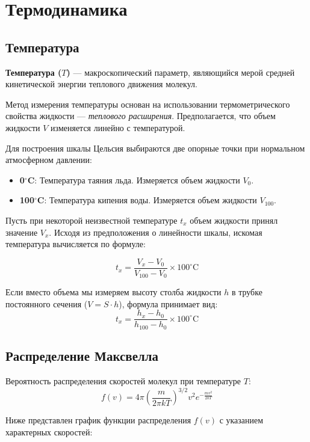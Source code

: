 \section{Термодинамика}

\subsection{Температура}

\textbf{Температура ($T$)} --- макроскопический параметр, являющийся мерой средней кинетической энергии теплового движения молекул.

Метод измерения температуры основан на использовании термометрического свойства жидкости --- \textit{теплового расширения}. Предполагается, что объем жидкости $V$ изменяется линейно с температурой.

Для построения шкалы Цельсия выбираются две опорные точки при нормальном атмосферном давлении:
\begin{itemize}
    \item \textbf{0$^\circ$C}: Температура таяния льда. Измеряется объем жидкости $V_0$.
    \item \textbf{100$^\circ$C}: Температура кипения воды. Измеряется объем жидкости $V_{100}$.
\end{itemize}

Пусть при некоторой неизвестной температуре $t_x$ объем жидкости принял значение $V_x$. Исходя из предположения о линейности шкалы, искомая температура вычисляется по формуле:

\[
t_x = \frac{V_x - V_0}{V_{100} - V_0} \times 100^\circ\text{C}
\]

Если вместо объема мы измеряем высоту столба жидкости $h$ в трубке постоянного сечения ($V = S \cdot h$), формула принимает вид:
\[
t_x = \frac{h_x - h_0}{h_{100} - h_0} \times 100^\circ\text{C}
\]

\subsection{Распределение Максвелла}
Вероятность распределения скоростей молекул при температуре $T$:
\[
f(v) = 4\pi \left( \frac{m}{2\pi kT} \right)^{3/2} v^2 e^{-\frac{mv^2}{2kT}}
\]

Ниже представлен график функции распределения $f(v)$ с указанием характерных скоростей:

